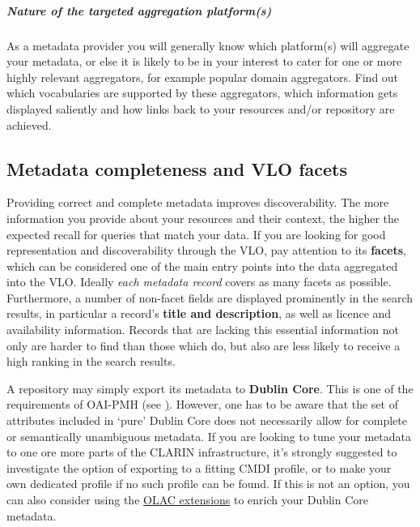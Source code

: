 \subparagraph{Nature of the targeted aggregation
platform(s)} \label{nature-of-the-targeted-aggregation-platforms}

As a metadata provider you will generally know which platform(s) will aggregate your metadata, or else it is likely to be in your interest to cater for one or more highly relevant aggregators, for example popular domain aggregators. Find out which vocabularies are supported by these aggregators, which information gets displayed saliently and how links back to your resources and/or repository are achieved.

\subsection{Metadata completeness and VLO facets} \label{metadata-completeness-and-vlo-facets}

Providing correct and complete metadata improves discoverability. The more information you provide about your resources and their context, the higher the expected recall for queries that match your data. If you are looking for good representation and discoverability through the VLO, pay
attention to its \textbf{facets}, which can be considered one of the main entry points into the data aggregated into the VLO. Ideally \emph{each metadata record} covers as many facets as possible. Furthermore, a number of non-facet fields are displayed prominently in the search results, in particular a record's \textbf{title and description}, as well as licence and availability information. Records that are lacking this essential information not only are harder to find than those which do, but also are less likely to receive a high ranking
in the search results. 

A repository may simply export its metadata to \textbf{Dublin Core}. This is one of the requirements of OAI-PMH (see
\href{https://www.openarchives.org/OAI/2.0/openarchivesprotocol.2015-01-08.htm\#Record}). However, one has to be aware that the set of attributes included in `pure' Dublin Core does not necessarily allow for complete or semantically unambiguous metadata. If you are looking to tune your metadata to one ore more parts of the CLARIN infrastructure, it's strongly suggested to investigate the option of exporting to a fitting
CMDI profile, or to make your own dedicated profile if no such profile can be found. If this is not an option, you can also consider using the \href{http://www.language-archives.org/OLAC/metadata.html}{OLAC extensions} to enrich your Dublin Core metadata.

